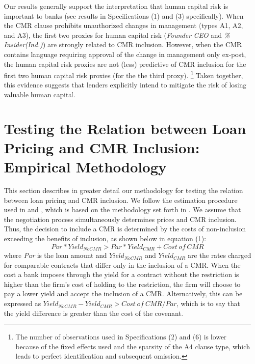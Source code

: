 \documentclass[12pt]{article}
\begin{document}
\begin{appendices}
Our results generally support the interpretation that human capital risk is important to banks (see results in Specifications (1) and (3) specifically).
When the CMR clause prohibits unauthorized changes in management (types A1, A2, and A3), the first two proxies for human capital risk  (\textit{Founder CEO} and \textit{\% Insider(Ind.)}) are strongly related to CMR inclusion.
However, when the CMR contains language requiring approval of the change in management only ex-post, the human capital risk proxies are not (less) predictive of CMR inclusion for the first two human capital risk proxies (for the the third proxy).%
    \footnote{The number of observations used in Specifications (2) and (6) is lower because of the fixed effects used and the sparsity of the A4 clause type, which leads to perfect identification and subsequent omission.}
Taken together, this evidence suggests that lenders explicitly intend to mitigate the risk of losing valuable human capital.




\section{Testing the Relation between Loan Pricing and CMR Inclusion: Empirical Methodology}
 \label{IApp:pricing_description}

This section describes in greater detail our methodology for testing the relation between loan pricing and CMR inclusion.
We follow the estimation procedure used in \cite{Miller_2012} and \cite{Bradley_2015}, which is based on the methodology set forth in \cite{Lee_1978}.
We assume that the negotiation process simultaneously determines prices and CMR inclusion.
Thus, the decision to include a CMR is determined by the costs of non-inclusion exceeding the benefits of inclusion, as shown below in equation (1): %
%
\begin{equation}
Par*Yield_{NoCMR} > Par * Yield_{CMR} + Cost\ of\ CMR
\end{equation}%
%
where \textit{Par} is the loan amount and $Yield_{NoCMR}$ and $Yield_{CMR}$ are the rates charged for comparable contracts that differ only in the inclusion of a CMR.
When the cost a bank imposes through the yield for a contract without the restriction is higher than the firm's cost of holding to the restriction, the firm will choose to pay a lower yield and accept the inclusion of a CMR.
Alternatively, this can be expressed as $Yield_{NoCMR} - Yield_{CMR} > Cost\ of\ CMR / Par$, which is to say that the yield difference is greater than the cost of the covenant.



\end{appendices}
\end{document}

